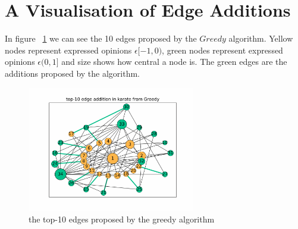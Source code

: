  \section{A Visualisation of Edge Additions}
\label{sec:vis}
In figure ~\ref{fig:top-10-karate} we can see the 10 edges proposed by the $Greedy$ algorithm. Yellow nodes represent expressed opinions $\epsilon [-1,0)$, green nodes represent expressed opinions $\epsilon (0,1]$ and size shows how central a node is. The green edges are the additions proposed by the algorithm.
\\

\begin{figure}[!htbp]
	\centering
	\captionsetup{justification=centering,margin=2cm}
	\includegraphics[width=0.65\textwidth]{Figures/top-10_karate_greedy}
	\caption{the top-10 edges proposed by the greedy algorithm}
	\label{fig:top-10-karate}
\end{figure}

